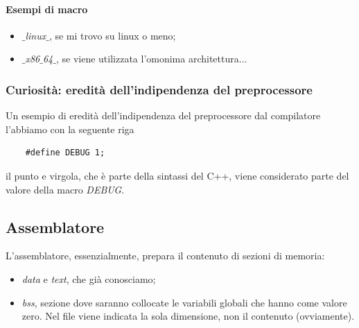 \paragraph{Esempi di macro}
\begin{itemize}
	\item \emph{$\_$linux$\_$}, se mi trovo su linux o meno;
	\item \emph{$\_$x86$\_$64$\_$}, se viene utilizzata l'omonima architettura...
\end{itemize}
\subsubsection{Curiosità: eredità dell'indipendenza del preprocessore}
Un esempio di eredità dell'indipendenza del preprocessore dal compilatore l'abbiamo con la seguente riga
\begin{verbatim}
	#define DEBUG 1;
\end{verbatim}
il punto e virgola, che è parte della sintassi del C++, viene considerato parte del valore della macro \emph{DEBUG}.
\clearpage
\subsection{Assemblatore}
L'assemblatore, essenzialmente, prepara il contenuto di sezioni di memoria:
\begin{itemize}
	\item \emph{data} e \emph{text}, che già conosciamo;
	\item \emph{bss}, sezione dove saranno collocate le variabili globali che hanno come valore zero. Nel file viene indicata la sola dimensione, non il contenuto (ovviamente).
\end{itemize} 
